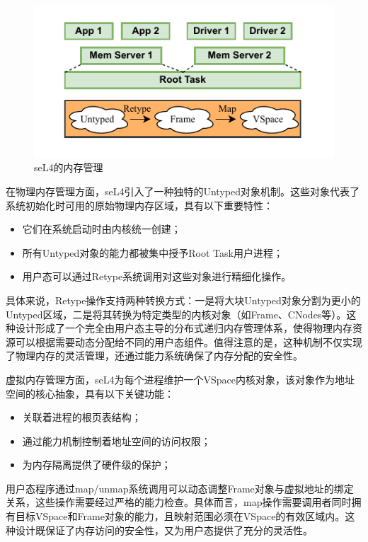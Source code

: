\begin{figure}[htbp]
  \centering
  \includegraphics[width=1.0\textwidth]{figures/seL4_mm.drawio.pdf}
  \caption{seL4的内存管理}\label{fig:seL4_mm}
\end{figure}

在物理内存管理方面，seL4引入了一种独特的Untyped对象机制。这些对象代表了系统初始化时可用的原始物理内存区域，具有以下重要特性：
\begin{itemize}
  \item 它们在系统启动时由内核统一创建；
  \item 所有Untyped对象的能力都被集中授予Root Task用户进程；
  \item 用户态可以通过Retype系统调用对这些对象进行精细化操作。
\end{itemize}

具体来说，Retype操作支持两种转换方式：一是将大块Untyped对象分割为更小的Untyped区域，二是将其转换为特定类型的内核对象（如Frame、CNodes等）。这种设计形成了一个完全由用户态主导的分布式递归内存管理体系，使得物理内存资源可以根据需要动态分配给不同的用户态组件。值得注意的是，这种机制不仅实现了物理内存的灵活管理，还通过能力系统确保了内存分配的安全性。

虚拟内存管理方面，seL4为每个进程维护一个VSpace内核对象，该对象作为地址空间的核心抽象，具有以下关键功能：
\begin{itemize}
  \item 关联着进程的根页表结构；
  \item 通过能力机制控制着地址空间的访问权限；
  \item 为内存隔离提供了硬件级的保护；
\end{itemize}

用户态程序通过map/unmap系统调用可以动态调整Frame对象与虚拟地址的绑定关系，这些操作需要经过严格的能力检查。具体而言，map操作需要调用者同时拥有目标VSpace和Frame对象的能力，且映射范围必须在VSpace的有效区域内。这种设计既保证了内存访问的安全性，又为用户态提供了充分的灵活性。

